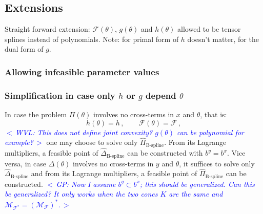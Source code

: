 \documentclass{article}
\DeclareMathOperator*{\minimize}{minimize}
\DeclareMathOperator*{\subj}{subject\;to}
\newcommand{\commentGP}[1]{\noindent \textcolor{blue}{\emph{$<\,$GP: #1$\,>$}}}%
\newcommand{\commentWVL}[1]{\noindent \textcolor{blue}{\emph{$<\,$WVL: #1$\,>$}}}%
\newcommand{\adj}{\ast}                     %
\newcommand{\ppar}{\theta}                          %
\newcommand{\Ppar}{{\bm{\theta}}}                   %
\newcommand{\X}{\mathbf{X}}                         %
\newcommand{\calF}{\mathcal{F}}                     %
\newcommand{\cx}{\textsf{x}}        %
\newcommand{\Alpha}{\bm{\alpha}}    %
\newcommand{\cg}{\textsf{g}}            %
\newcommand{\calMF}{\mathcal{M}_{\mathcal{F}}}
\newcommand{\calMFadj}{\mathcal{M}_{\mathcal{F}^\adj}}
\begin{document}
%



\subsection{Extensions}\label{subsec:extensions}

Straight forward extension: $\calF(\ppar)$, $g(\ppar)$ and $h(\ppar)$ allowed to be tensor splines instead of polynomials. Note: for primal form of $h$ doesn't matter, for the dual form of $g$.


\subsubsection{Allowing infeasible parameter values}%

\subsubsection{Simplification in case only $h$ or $g$ depend $\ppar$}%
In case the problem $\Pi(\ppar)$ involves no cross-terms in $x$ and $\ppar$, that is:
\[ h(\ppar) = h\,,\qquad \calF(\ppar) = \calF\,,
\]
\commentWVL{This does not define joint convexity? $g(\ppar)$ can be polynomial
for example?}
one may choose to solve only $\hat{\Pi}_\text{B-spline}$. From its Lagrange multipliers, a feasible point of $\hat{\Delta}_\text{B-spline}$ can be constructed with $b^y=b^x$. Vice versa, in case $\Delta(\ppar)$ involves no cross-terms in $y$ and $\ppar$, it suffices to solve only $\hat{\Delta}_\text{B-spline}$ and from its Lagrange multipliers, a feasible point of $\hat{\Pi}_\text{B-spline}$ can be constructed. \commentGP{Now I assume $b^g\subset b^x$; this should be generalized. Can this be generalized? It only works when the two cones $K$ are the same and $\calMFadj=(\calMF)^\adj$.}
\end{document}
